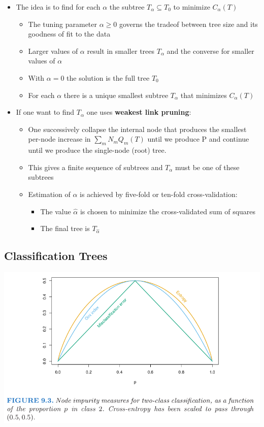 \documentclass[11pt]{article}
\begin{document}
\begin{itemize}
\item The idea is to find for each \(\alpha\) the subtree \(T_\alpha \subseteq T_0\) to minimize \(C_\alpha(T)\)
\begin{itemize}
\item The tuning parameter \(\alpha \geq 0\) governs the tradeof between tree size and its goodness of fit to the data
\item Larger values of \(\alpha\) result in smaller trees \(T_\alpha\) and the converse for smaller values of \(\alpha\)
\item With \(\alpha = 0\) the solution is the full tree \(T_0\)
\item For each \(\alpha\) there is a unique smallest subtree \(T_\alpha\) that minimizes \(C_\alpha(T)\)
\end{itemize}

\item If one want to find \(T_\alpha\) one uses \textbf{weakest link pruning}:
\begin{itemize}
\item One successively collapse the internal node that produces the smallest per-node increase in \(\sum_m N_mQ_m(T)\) until we produce P and continue until we produce the single-node (root) tree.
\item This gives a finite sequence of subtrees and \(T_\alpha\) must be one of these subtrees
\item Estimation of \(\alpha\) is achieved by five-fold or ten-fold cross-validation:
\begin{itemize}
\item The value \(\hat \alpha\) is chosen to minimize the cross-validated sum of squares
\item The final tree is \(T_{\hat \alpha}\)
\end{itemize}
\end{itemize}
\end{itemize}

\subsection{Classification Trees}
\label{sec:orga0f632e}
\begin{center}
\includegraphics[width=.9\linewidth]{Tree-Based Methods/screenshot_2018-10-08_16-49-37.png}
\end{center}
\end{document}
